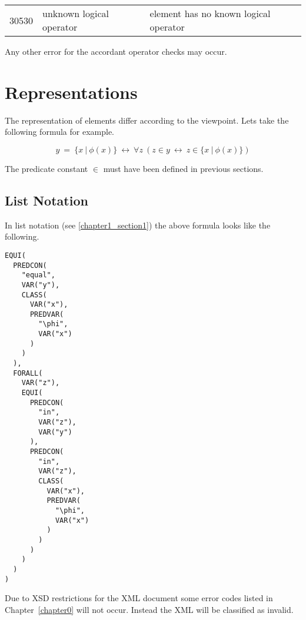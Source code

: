 \documentclass[a4paper,german,10pt,twoside]{book}
\theoremstyle{definition}
\theoremstyle{remark}
\begin{document}
\begin{tabularx}{\linewidth}{llX}
  30530  & unknown logical operator & element has no known logical operator
\end{tabularx}

\par
Any other error for the accordant operator checks may occur.




\chapter{Representations} \label{chapter3} \hypertarget{chapter3}{}

The representation of elements differ according to the viewpoint. Lets take the following formula for example.

$$y \ =  \ \{ x \ | \ \phi(x) \} \ \leftrightarrow \ \forall z\ (z \in y\ \leftrightarrow \ z \in \{ x \ | \ \phi(x) \} )$$

The predicate constant $\in$ must have been defined in previous sections.

\section{List Notation} \label{chapter3_section0} \hypertarget{chapter3_section0}{}
In list notation (see \ref{chapter1_section1}) the above formula looks like the following.

\begin{verbatim}
EQUI(
  PREDCON(
    "equal",
    VAR("y"),
    CLASS(
      VAR("x"),
      PREDVAR(
        "\phi",
        VAR("x")
      )
    )
  ),
  FORALL(
    VAR("z"),
    EQUI(
      PREDCON(
        "in",
        VAR("z"),
        VAR("y")
      ),
      PREDCON(
        "in",
        VAR("z"),
        CLASS(
          VAR("x"),
          PREDVAR(
            "\phi",
            VAR("x")
          )
        )
      )
    )
  )
)
\end{verbatim}

Due to XSD restrictions for the XML document some error codes listed in Chapter~\ref{chapter0} will not occur. Instead the XML will be classified as invalid.
\end{document}
